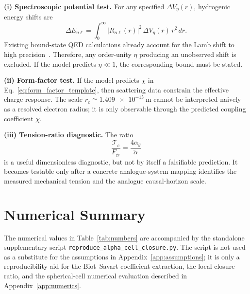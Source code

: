 \documentclass[aps,pra,preprint,longbibliography,nofootinbib]{revtex4-2}
\newcommand{\Tc}{\mathcal{T}_c}                  %
\newcommand{\Fgr}{F_{\mathrm{gr}}}              %
\begin{document}
\medskip
\noindent\textbf{(i) Spectroscopic potential test.}
For any specified $\Delta V_\eta(r)$, hydrogenic energy shifts are
\begin{equation}
  \Delta E_{n\ell}
  = \int_0^\infty |R_{n\ell}(r)|^2\,\Delta V_\eta(r)\,r^2\,dr.
  \label{eq:lamb_template}
\end{equation}
Existing bound-state QED calculations already account for the Lamb
shift to high precision~\cite{Bethe1947,Karshenboim2005}.  Therefore,
any order-unity $\eta$ producing an unobserved shift is excluded.  If the
model predicts $\eta\ll1$, the corresponding bound must be stated.

\medskip
\noindent\textbf{(ii) Form-factor test.}
If the model predicts $\chi$ in Eq.~\eqref{eq:form_factor_template}, then
scattering data constrain the effective charge response.  The scale
$r_c\simeq\SI{1.409e-15}{\meter}$ cannot be interpreted naively as a
resolved electron radius; it is only observable through the predicted
coupling coefficient $\chi$.

\medskip
\noindent\textbf{(iii) Tension-ratio diagnostic.}
The ratio
\begin{equation}
  \frac{\Tc}{\Fgr}=\frac{4\alpha_g}{\tilde\alpha}
  \label{eq:tension_ratio_diagnostic}
\end{equation}
is a useful dimensionless diagnostic, but not by itself a falsifiable
prediction.  It becomes testable only after a concrete analogue-system
mapping identifies the measured mechanical tension and the analogue
causal-horizon scale.

\section{Numerical Summary}
\label{sec:numerical}

The numerical values in Table~\ref{tab:numbers} are accompanied by the
standalone supplementary script
\texttt{reproduce\_alpha\_cell\_closure.py}.  The script is not used as a
substitute for the assumptions in Appendix~\ref{app:assumptions}; it is
only a reproducibility aid for the Biot--Savart coefficient extraction,
the local closure ratio, and the spherical-cell numerical evaluation
described in Appendix~\ref{app:numerics}.
\end{document}
